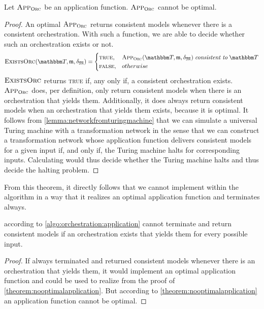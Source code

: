 \begin{theorem}
    \label{theorem:nooptimalapplication}
    Let $\textsc{App}_{\textsc{Orc}_{}}$ be an application function. $\textsc{App}_{\textsc{Orc}_{}}$ cannot be optimal.
\end{theorem}
\begin{proof}
    An optimal $\textsc{App}_{\textsc{Orc}_{}}$ returns consistent models whenever there is a consistent orchestration.
    With such a function, we are able to decide whether such an orchestration exists or not.
    \begin{align*}
        \function{ExistsOrc}(\transformationset{T},\modeltuple{m},\changetuple{\metamodeltuple{M}}) =
            \begin{cases}
                \textsc{true}, & \appfunction{\orcfunction{}}(\transformationset{T}, \modeltuple{m},\changetuple{\metamodeltuple{M}}) \consistenttomath \transformationset{T} \\
                \textsc{false}, & otherwise
            \end{cases}
    \end{align*}
    $\textsc{ExistsOrc}$ returns \textsc{true} if, any only if, a consistent orchestration exists.
    $\textsc{App}_{\textsc{Orc}_{}}$ does, per definition, only return consistent models when there is an orchestration that yields them.
    Additionally, it does always return consistent models when an orchestration that yields them exists, because it is optimal.
    It follows from \autoref{lemma:networkfromturingmachine} that we can simulate a universal Turing machine with a transformation network in the sense that we can construct a transformation network whose application function delivers consistent models for a given input if, and only if, the Turing machine halts for corresponding inputs.
    Calculating  would thus decide whether the Turing machine halts and thus decide the halting problem.
\end{proof}

From this theorem, it directly follows that we cannot implement  within the  algorithm in a way that it realizes an optimal application function and terminates always.

\begin{corollary}
     according to \autoref{algo:orchestration:application} cannot terminate and return consistent models if an orchestration exists that yields them for every possible input.
\end{corollary}
\begin{proof}
    If  always terminated and returned consistent models whenever there is an orchestration that yields them, it would implement an optimal application function and could be used to realize  from the proof of \autoref{theorem:nooptimalapplication}.
    But according to \autoref{theorem:nooptimalapplication} an application function cannot be optimal.
\end{proof}

